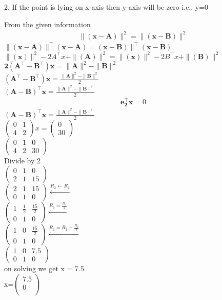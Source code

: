 \documentclass[journal,10pt,twocolumn]{article}
\newcommand{\myvec}[1]{\ensuremath{\begin{pmatrix}#1\end{pmatrix}}}
\let\vec\mathbf
\begin{document}
\raggedright 2. If the point is lying on x-axis then y-axis will be zero i.e.. y=0

From the given information\\

\begin{align}
	\|\vec{(x-A)}\|^2 = \|\vec{(x-B)}\|^2
\end{align}  
    $\|\vec{(x-A)}\|^{\top} \vec{{(x-A)}} = \vec{(x-B)}\|^{\top} \vec{{(x-B)}}$\\          \vspace{2mm}
    $\|\vec{(x)}\|^2 - 2A^{\top}x + \|\vec{(A)}\|^2 = \|\vec{(x)}\|^2 - 2B^{\top}x + \|\vec{(B)}\|^2$\\ \vspace{2mm}    
    $\vec{2(A^{\top}-B^{\top})x} =  \|\vec{A}\|^2 - \|\vec{B}\|^2 $\\ \vspace{2mm}
    $\vec{(A^{\top}-B^{\top})x} = \frac{\|\vec{A}\|^2 - \|\vec{B}\|^2}{2}$\\ \vspace{2mm}
    $\vec{(A-B)^{\top}x} = \frac{\|\vec{A}\|^2 - \|\vec{B}\|^2}{2}$\\  \vspace{2mm}
\begin{align}
	\vec{e_2^{\top}x} = 0
\end{align}  
$\vec{(A-B)^{\top}x} = \frac{\|\vec{A}\|^2 - \|\vec{B}\|^2}{2}$\\ \vspace{2mm}
     $\myvec{0 & 1 \\ 4 & 2}x = $\myvec{0 \\ 30}\\ \vspace{2mm}
      $\myvec{0 & 1 & 0 \\ 4 & 2 & 30}$\\    \vspace{2mm}
      Divide by 2\\
      $\myvec{0 & 1 & 0 \\ 2 & 1 & 15}$\\    \vspace{2mm}
     $\myvec{2 & 1 & 15 \\ 0 & 1 & 0}
    \xleftarrow[]{R_2 \leftarrow R_1}$\\     \vspace{2mm}
    $\myvec{1 & \frac{1}{2} & \frac{15}{2} \\ 0 & 1 & 0}\xleftarrow[]{{R_1}=\frac{R_1}{2}}$\\            \vspace{2mm}
    $\myvec{1 & 0 & \frac{15}{2} \\ 0 & 1 & 0}\xleftarrow[]{{R_1}={R_1}-\frac{R_2}{2}}$\\             \vspace{2mm}
    $\myvec{1 & 0 & 7.5 \\ 0 & 1 & 0}$\\        \vspace{2mm}
on solving we get x = 7.5\\
\vspace{2mm}
  x=$\begin{pmatrix}
  7.5 \\
  0 \\
 \end{pmatrix}$               			
\end{document}
